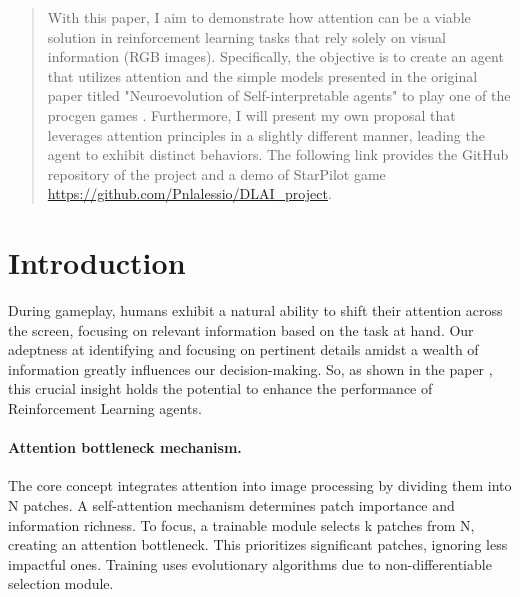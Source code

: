 \documentclass{article}
\begin{document}

\printAffiliationsAndNotice{}

\begin{abstract}
%
With this paper, I aim to demonstrate how attention can be a viable solution in reinforcement learning tasks that rely solely on visual information (RGB images). Specifically, the objective is to create an agent that utilizes attention and the simple models presented in the original paper titled "Neuroevolution of Self-interpretable agents"\cite{neuroevolution} to play one of the procgen games \cite{procgen}. Furthermore, I will present my own proposal that leverages attention principles in a slightly different manner, leading the agent to exhibit distinct behaviors. The following link provides the GitHub repository of the project and a demo of StarPilot game \url{https://github.com/Pnlalessio/DLAI_project}.
%
\end{abstract}

\section{Introduction}

During gameplay, humans exhibit a natural ability to shift their attention across the screen, focusing on relevant information based on the task at hand. Our adeptness at identifying and focusing on pertinent details amidst a wealth of information greatly influences our decision-making. So, as shown in the paper \cite{neuroevolution}, this crucial insight holds the potential to enhance the performance of Reinforcement Learning agents.

\paragraph*{Attention bottleneck mechanism.}
The core concept integrates attention into image processing by dividing them into N patches. A self-attention mechanism determines patch importance and information richness. To focus, a trainable module selects k patches from N, creating an attention bottleneck. This prioritizes significant patches, ignoring less impactful ones. Training uses evolutionary algorithms due to non-differentiable selection module.
\end{document}
